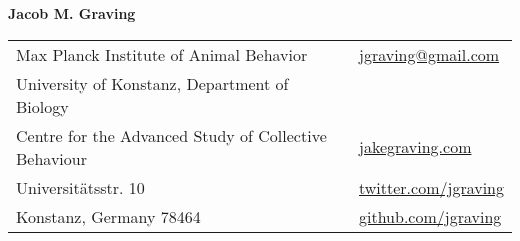 \documentclass[letterpaper,10pt,oneside]{article}
\begin{document}

\LARGE{\textbf{Jacob M. Graving}}  \\
\normalsize



\begin{center}
\begin{tabular}{l l}
 Max Planck Institute of Animal Behavior		& \hspace{2in} \href{mailto:jgraving@gmail.com}{\faEnvelope{ } jgraving@gmail.com} \\
 University of Konstanz, Department of Biology	\\ %
  Centre for the Advanced Study of Collective Behaviour    & \hspace{2in}  \href{http://jakegraving.com/}{\faGlobe{ } jakegraving.com}   \\
  Universit\"{a}tsstr. 10  & \hspace{2in}  \href{https://twitter.com/jgraving}{\faTwitter{ }  twitter.com/jgraving}   \\
   Konstanz, Germany 78464         & \hspace{2in} \href{https://github.com/jgraving}{\faGithub{ }  github.com/jgraving} \\
 
\end{tabular}
\end{center}
\end{document}
